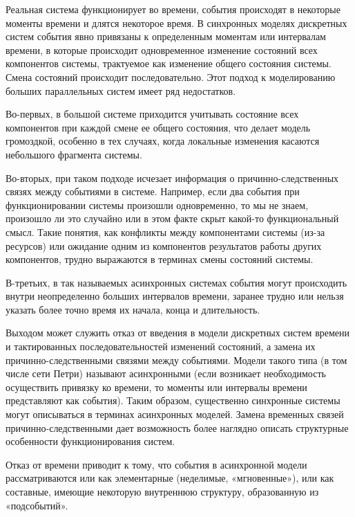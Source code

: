 Реальная система функционирует во времени, события происходят в некоторые моменты времени и длятся некоторое время. В синхронных моделях дискретных систем события явно привязаны к определенным моментам или интервалам времени, в которые происходит одновременное изменение состояний всех компонентов системы, трактуемое как изменение общего состояния системы. Смена состояний происходит последовательно. Этот подход к моделированию больших параллельных систем имеет ряд недостатков.

Во-первых, в большой системе приходится учитывать состояние всех компонентов при каждой смене ее общего состояния, что делает модель громоздкой, особенно в тех случаях, когда локальные изменения касаются небольшого фрагмента системы.

Во-вторых, при таком подходе исчезает информация о причинно-следственных связях между событиями в системе. Например, если два события при функционировании системы произошли одновременно, то мы не знаем, произошло ли это случайно или в этом факте скрыт какой-то функциональный смысл. Такие понятия, как конфликты между компонентами системы (из-за ресурсов) или ожидание одним из компонентов результатов работы других компонентов, трудно выражаются в терминах смены состояний системы.

В-третьих, в так называемых асинхронных системах события могут происходить внутри неопределенно больших интервалов времени, заранее трудно или нельзя указать более точно время их начала, конца и длительность.

Выходом может служить отказ от введения в модели дискретных систем времени и тактированных последовательностей изменений состояний, а замена их причинно-следственными связями между событиями. Модели такого типа (в том числе сети Петри) называют асинхронными (если возникает необходимость осуществить привязку ко времени, то моменты или интервалы времени представляют как события). Таким образом, существенно синхронные системы могут описываться в терминах асинхронных моделей. Замена временных связей причинно-следственными дает возможность более наглядно описать структурные особенности функционирования систем.

Отказ от времени приводит к тому, что события в асинхронной модели рассматриваются или как элементарные (неделимые, «мгновенные»)‚ или как составные, имеющие некоторую внутреннюю структуру, образованную
из «подсобытий».

